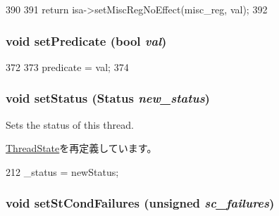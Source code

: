 \begin{DoxyCode}
390     {
391         return isa->setMiscRegNoEffect(misc_reg, val);
392     }
\end{DoxyCode}
\hypertarget{classSimpleThread_a137a8c6cced89c2ff8387900439436b4}{
\subsubsection[{setPredicate}]{\setlength{\rightskip}{0pt plus 5cm}void setPredicate (bool {\em val})}}
\label{classSimpleThread_a137a8c6cced89c2ff8387900439436b4}



\begin{DoxyCode}
372     {
373         predicate = val;
374     }
\end{DoxyCode}
\hypertarget{classSimpleThread_a1ab41c7c20554bc6a9205b5b69d30406}{
\subsubsection[{setStatus}]{\setlength{\rightskip}{0pt plus 5cm}void setStatus ({\bf Status} {\em new\_\-status})}}
\label{classSimpleThread_a1ab41c7c20554bc6a9205b5b69d30406}
Sets the status of this thread. 

\hyperlink{structThreadState_acdf331c877974ed8697216475a21998d}{ThreadState}を再定義しています。


\begin{DoxyCode}
212 { _status = newStatus; }
\end{DoxyCode}
\hypertarget{classSimpleThread_abbe779fa43c72cd485ddb736ab17ff61}{
\subsubsection[{setStCondFailures}]{\setlength{\rightskip}{0pt plus 5cm}void setStCondFailures (unsigned {\em sc\_\-failures})}}
\label{classSimpleThread_abbe779fa43c72cd485ddb736ab17ff61}



